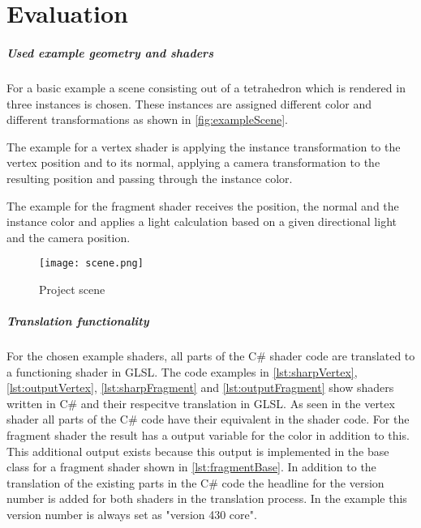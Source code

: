 
\chapter{Evaluation}\label{cha:Evaluation}

\paragraph{Used example geometry and shaders}

For a basic example a scene consisting out of a tetrahedron which is rendered in three instances is chosen. These instances are assigned different color and different transformations as shown in  \autoref{fig:exampleScene}.

The example for a vertex shader is applying the instance transformation to the vertex position and to its normal, applying a camera transformation to the resulting position and passing through the instance color.

The example for the fragment shader receives the position, the normal and the instance color and applies a light calculation based on a given directional light and the camera position.

\begin{figure}[h!]
  \centering 
  \texttt{[image: scene.png]}
  \caption[Screenshot of example scene of the project]{Project scene}
  \label{fig:exampleScene}
\end{figure}

\paragraph{Translation functionality}

For the chosen example shaders, all parts of the C\# shader code are translated to a functioning shader in GLSL. The code examples in \autoref{lst:sharpVertex},\autoref{lst:outputVertex}, \autoref{lst:sharpFragment} and \autoref{lst:outputFragment} show shaders written in C\# and their respecitve translation in GLSL. As seen in the vertex shader all parts of the C\# code have their equivalent in the shader code. For the fragment shader the result has a output variable for the color in addition to this. This additional output exists because this output is implemented in the base class for a fragment shader shown in \autoref{lst:fragmentBase}. In addition to the translation of the existing parts in the C\# code the headline for the version number is added for both shaders in the translation process. In the example this version number is always set as "version 430 core".

